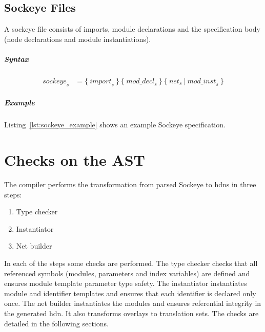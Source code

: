 \documentclass[a4paper,11pt,twoside]{report}
\begin{document}
{{{\section{Sockeye Files}
A sockeye file consists of imports, module declarations and the specification body (node declarations and module instantiations).

\paragraph{Syntax}
\begin{align*}
    \textit{sockeye}_s & \mathop{=}
        \big\{\ 
            \textit{import}_s\ 
        \big\}\ 
        \big\{\ 
            \textit{mod\_decl}_s\ 
        \big\}\ 
        \big\{\ 
            \textit{net}_s\ |\ \textit{mod\_inst}_s\ 
        \big\}
\end{align*}

\paragraph{Example}
Listing~\ref{lst:sockeye_example} shows an example Sockeye specification.

\clearpage



\chapter{Checks on the AST}
\label{chap:checks}
The compiler performs the transformation from parsed Sockeye to \gls{hdn}s in three steps:
\begin{enumerate}
    \item Type checker
    \item Instantiator
    \item Net builder
\end{enumerate}
In each of the steps some checks are performed.
The type checker checks that all referenced symbols (modules, parameters and index variables) are defined and ensures module template parameter type safety.
The instantiator instantiates module and identifier templates and ensures that each identifier is declared only once.
The net builder instantiates the modules and ensures referential integrity in the generated \gls{hdn}. It also transforms overlays to translation sets.
The checks are detailed in the following sections.

}}}
\end{document}
